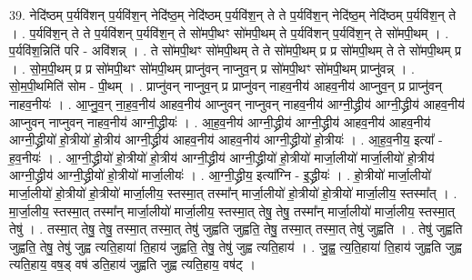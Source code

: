 \documentclass[17pt]{extarticle}
\begin{document}
39. नेदि॑ष्ठम् प॒र्यवि॑शन् प॒र्यवि॑श॒न् नेदि॑ष्ठ॒म् नेदि॑ष्ठम् प॒र्यवि॑श॒न् ते ते प॒र्यवि॑श॒न् नेदि॑ष्ठ॒म् नेदि॑ष्ठम् प॒र्यवि॑श॒न् ते । . प॒र्यवि॑श॒न् ते ते प॒र्यवि॑शन् प॒र्यवि॑श॒न् ते सो॑मपी॒थꣳ सो॑मपी॒थम् ते प॒र्यवि॑शन् प॒र्यवि॑श॒न् ते सो॑मपी॒थम् । . प॒र्यवि॑श॒न्निति॑ परि - अवि॑शन्न् । . ते सो॑मपी॒थꣳ सो॑मपी॒थम् ते ते सो॑मपी॒थम् प्र प्र सो॑मपी॒थम् ते ते सो॑मपी॒थम् प्र । . सो॒म॒पी॒थम् प्र प्र सो॑मपी॒थꣳ सो॑मपी॒थम् प्राप्नु॑वन् नाप्नुव॒न् प्र सो॑मपी॒थꣳ सो॑मपी॒थम् प्राप्नु॑वन्न् । . सो॒म॒पी॒थमिति॑ सोम - पी॒थम् । . प्राप्नु॑वन् नाप्नुव॒न् प्र प्राप्नु॑वन् नाहव॒नीय॑ आहव॒नीय॑ आप्नुव॒न् प्र प्राप्नु॑वन् नाहव॒नीयः॑ । . आ॒प्नु॒व॒न् ना॒ह॒व॒नीय॑ आहव॒नीय॑ आप्नुवन् नाप्नुवन् नाहव॒नीय॑ आग्नी॒द्ध्रीय॑ आग्नी॒द्ध्रीय॑ आहव॒नीय॑ आप्नुवन् नाप्नुवन् नाहव॒नीय॑ आग्नी॒द्ध्रीयः॑ । . आ॒ह॒व॒नीय॑ आग्नी॒द्ध्रीय॑ आग्नी॒द्ध्रीय॑ आहव॒नीय॑ आहव॒नीय॑ आग्नी॒द्ध्रीयो॑ हो॒त्रीयो॑ हो॒त्रीय॑ आग्नी॒द्ध्रीय॑ आहव॒नीय॑ आहव॒नीय॑ आग्नी॒द्ध्रीयो॑ हो॒त्रीयः॑ । . आ॒ह॒व॒नीय॒ इत्या᳚ - ह॒व॒नीयः॑ । . आ॒ग्नी॒द्ध्रीयो॑ हो॒त्रीयो॑ हो॒त्रीय॑ आग्नी॒द्ध्रीय॑ आग्नी॒द्ध्रीयो॑ हो॒त्रीयो॑ मार्जा॒लीयो॑ मार्जा॒लीयो॑ हो॒त्रीय॑ आग्नी॒द्ध्रीय॑ आग्नी॒द्ध्रीयो॑ हो॒त्रीयो॑ मार्जा॒लीयः॑ । . आ॒ग्नी॒द्ध्रीय॒ इत्या᳚ग्नि - इ॒द्ध्रीयः॑ । . हो॒त्रीयो॑ मार्जा॒लीयो॑ मार्जा॒लीयो॑ हो॒त्रीयो॑ हो॒त्रीयो॑ मार्जा॒लीय॒ स्तस्मा॒त् तस्मा᳚न् मार्जा॒लीयो॑ हो॒त्रीयो॑ हो॒त्रीयो॑ मार्जा॒लीय॒ स्तस्मा᳚त् । . मा॒र्जा॒लीय॒ स्तस्मा॒त् तस्मा᳚न् मार्जा॒लीयो॑ मार्जा॒लीय॒ स्तस्मा॒त् तेषु॒ तेषु॒ तस्मा᳚न् मार्जा॒लीयो॑ मार्जा॒लीय॒ स्तस्मा॒त् तेषु॑ । . तस्मा॒त् तेषु॒ तेषु॒ तस्मा॒त् तस्मा॒त् तेषु॑ जुह्वति जुह्वति॒ तेषु॒ तस्मा॒त् तस्मा॒त् तेषु॑ जुह्वति । . तेषु॑ जुह्वति जुह्वति॒ तेषु॒ तेषु॑ जुह्व त्यति॒हाया॑ ति॒हाय॑ जुह्वति॒ तेषु॒ तेषु॑ जुह्व त्यति॒हाय॑ । . जु॒ह्व॒ त्य॒ति॒हाया॑ ति॒हाय॑ जुह्वति जुह्व त्यति॒हाय॒ वष॒ड् वष॑ डति॒हाय॑ जुह्वति जुह्व त्यति॒हाय॒ वष॑ट् । \newline
\end{document}
